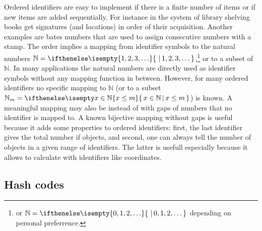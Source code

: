 Ordered identifiers are easy to implement if there is a finite number of
items or if new items are added sequentially. For instance in the 
 system of library shelving books get signatures 
(and locations) in order of their acquisition. Another examples are
bates numbers that are used to assign consecutive numbers with a stamp.
The order implies a mapping from identifier symbols to the natural numbers
$\mathbb{N}=\set{1,2,3,\ldots}$,\footnote{or $\mathbb{N}=\set{0,1,2,\ldots}$ 
depending on personal preferrence.} or to a subset of $\mathbb{N}$. In many
applications the natural numbers are directly used as identifier symbols 
without any mapping function in between. However, for many ordered identifiers 
no specific mapping to $\mathbb{N}$ (or to a subset 
$\mathbb{N}_m=\set[x\in\mathbb{N}]{x \le m}$) is known. A meaningful
mapping may also be  instead of  with gaps 
of numbers that no identifier is mapped to. A known bijective mapping without 
gaps is useful because it adds some properties to ordered identifiers: first,
the last identifier gives the total number if objects, and second, one 
can always tell the number of objects in a given range of identifiers. The 
latter is usefull especially because it allows to calculate with 
identifiers like coordinates. 


\subsection{Hash codes}
\label{sec:hashes}

